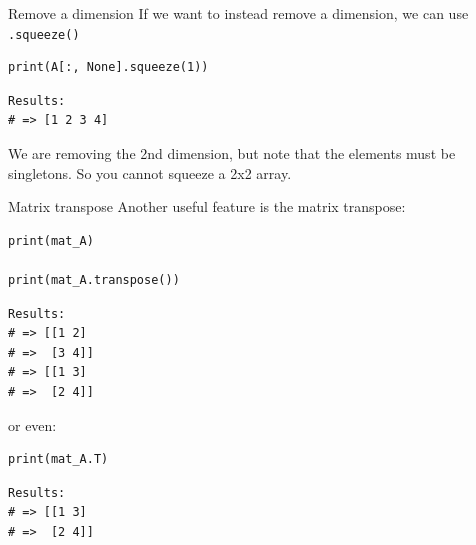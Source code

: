 \documentclass[10pt]{beamer}
\begin{document}
\begin{frame}[label={sec:orga0054af},fragile]{Remove a dimension}
 If we want to instead remove a dimension, we can use \texttt{.squeeze()}

\begin{verbatim}
print(A[:, None].squeeze(1))
\end{verbatim}

\begin{verbatim}
Results: 
# => [1 2 3 4]
\end{verbatim}


We are removing the 2nd dimension, but \alert{note} that the elements must be singletons. So
you cannot squeeze a 2x2 array.
\end{frame}

\begin{frame}[label={sec:org7ee54b0},fragile]{Matrix transpose}
 Another useful feature is the matrix transpose:

\begin{verbatim}
print(mat_A)

print(mat_A.transpose())
\end{verbatim}

\begin{verbatim}
Results: 
# => [[1 2]
# =>  [3 4]]
# => [[1 3]
# =>  [2 4]]
\end{verbatim}


or even:

\begin{verbatim}
print(mat_A.T)
\end{verbatim}

\begin{verbatim}
Results: 
# => [[1 3]
# =>  [2 4]]
\end{verbatim}
\end{frame}
\end{document}
